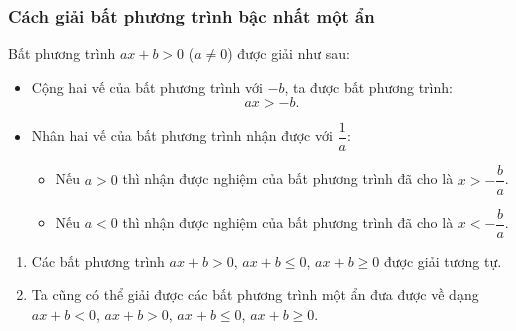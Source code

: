 \begin{tomtat}
\subsubsection{Cách giải bất phương trình bậc nhất một ẩn}
\begin{boxdn}
	Bất phương trình $ax+b>0$ ($a \neq 0$) được giải như sau:
	\begin{itemize}
	\item Cộng hai vế của bất phương trình với $-b$, ta được bất phương trình:
	\[ax > -b.\]
	\item Nhân hai vế của bất phương trình nhận được với $\dfrac{1}{a}$:
	\begin{itemize}
	\item Nếu $a>0$ thì nhận được nghiệm của bất phương trình đã cho là $x > -\dfrac{b}{a}$.
	\item Nếu $a<0$ thì nhận được nghiệm của bất phương trình đã cho là $x<-\dfrac{b}{a}$.
	\end{itemize}
	\end{itemize}
\end{boxdn}
\begin{luuy}
	\begin{enumerate}[\bf ---]
	\item Các bất phương trình $ax + b > 0$, $ax + b \leq 0$, $ax + b \geq 0$ được giải tương tự.
	\item
	Ta cũng có thể giải được các bất phương trình một ẩn đưa được về dạng $ax + b < 0$, $ax + b > 0$, $ax + b \leq 0$, $ax + b \geq 0$.
	\end{enumerate}
\end{luuy}
\end{tomtat}
